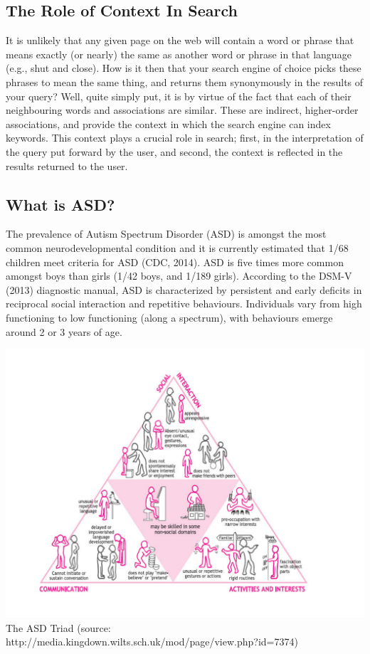 \documentclass[11pt]{article}
\begin{document}
\subsection{The Role of Context In Search}
It is unlikely that any given page on the web will contain a word or phrase that means exactly (or nearly) the same as another word or phrase in that language (e.g., shut and close). How is it then that your search engine of choice picks these phrases to mean the same thing, and returns them synonymously in the results of your query? Well, quite simply put, it is by virtue of the fact that each of their neighbouring words and associations are similar. These are indirect, higher-order associations, and provide the context in which the search engine can index keywords. This context plays a crucial role in search; first, in the interpretation of the query put forward by the user, and second, the context is reflected in the results returned to the user.

\subsection{What is ASD?}
The prevalence of Autism Spectrum Disorder (ASD) is amongst the most common neurodevelopmental condition and it is currently estimated that 1/68 children meet criteria for ASD (CDC, 2014). ASD is five times more common amongst boys than girls (1/42 boys, and 1/189 girls). According to the DSM-V (2013) diagnostic manual, ASD is characterized by persistent and early deficits in reciprocal social interaction and repetitive behaviours. Individuals vary from high functioning to low functioning (along a spectrum), with behaviours emerge around 2 or 3 years of age. 

\begin{center}
\includegraphics[scale=0.5]{asd}\\
The ASD Triad (source: http://media.kingdown.wilts.sch.uk/mod/page/view.php?id=7374)
\end{center}
\end{document}
